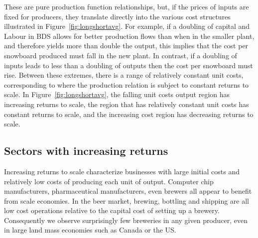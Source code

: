 These are pure production function relationships, but, if the prices of inputs are fixed for producers, they translate directly into the various cost structures illustrated in Figure~\ref{fig:longshortavg}. For example, if a doubling of capital and Labour in BDS allows for better production flows than when in the smaller plant, and therefore yields more than double the output, this implies that the cost per snowboard produced must fall in the new plant. In contrast, if a doubling of inputs leads to less than a doubling of outputs then the cost per snowboard must rise. Between these extremes, there is a range of relatively constant unit costs, corresponding to where the production relation is subject to constant returns to scale. In Figure~\ref{fig:longshortavg}, the falling unit costs output region has increasing returns to scale, the region that has relatively constant unit costs has constant returns to scale, and the increasing cost region has decreasing returns to scale.

\subsection*{Sectors with increasing returns}

Increasing returns to scale characterize businesses with large initial costs and relatively low costs of producing each unit of output. Computer chip manufacturers, pharmaceutical manufacturers, even brewers all appear to benefit from scale economies. In the beer market, brewing, bottling and shipping are all low cost operations relative to the capital cost of setting up a brewery. Consequently we observe surprisingly few breweries in any given producer, even in large land mass economies such as Canada or the US. 

